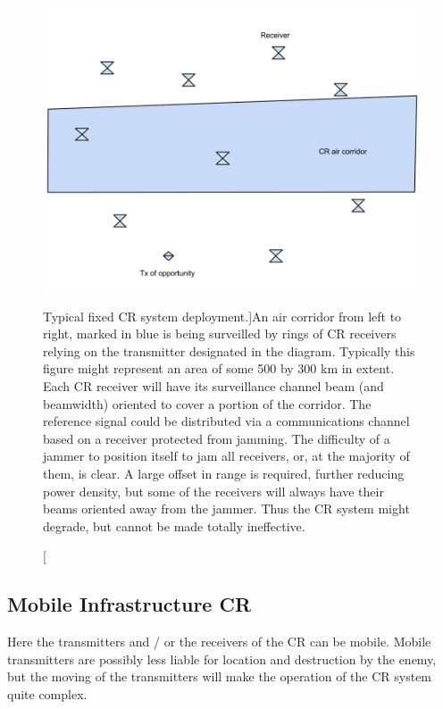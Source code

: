 \documentclass[english, 12pt]{report}
\begin{document}
\begin{figure}[htbp]
\begin{center}
\includegraphics[width=\columnwidth]{figs/CRdeploy}
\caption[Fixed architecture SIMO CR System example][Typical fixed CR system deployment.]{An air corridor from left to right, marked in blue is being surveilled by rings of CR receivers relying on the transmitter designated in the diagram. Typically this figure might represent an area of some 500 by 300 km in extent. Each CR receiver will have its surveillance channel beam (and beamwidth) oriented to cover a portion of the corridor. The reference signal could be distributed via a communications channel based on a receiver protected from jamming. The difficulty of a jammer to position itself to jam all receivers, or, at the majority of them, is clear. A large offset in range is required, further reducing power density, but some of the receivers will always have their beams oriented away from the jammer. Thus the CR system might degrade, but cannot be made totally ineffective.}
\label{fig:CRdeploy}
\end{center}
\end{figure}


\subsection{Mobile Infrastructure CR}

Here the transmitters and / or the receivers of the CR can be mobile. Mobile transmitters are possibly less liable for location and destruction by the enemy, but the moving of the transmitters will make the operation of the CR system quite complex. 
\end{document}
